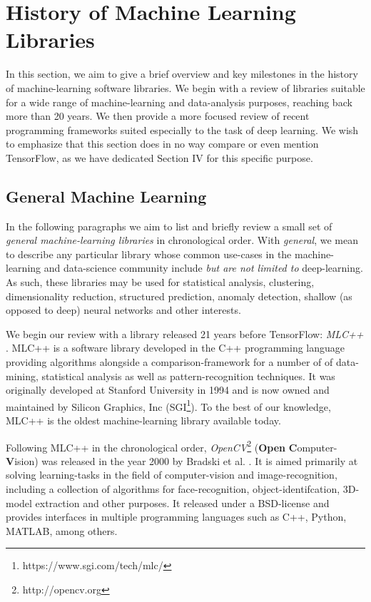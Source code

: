 \section{History of Machine Learning Libraries}

In this section, we aim to give a brief overview and key milestones in the
history of machine-learning software libraries. We begin with a review of
libraries suitable for a wide range of machine-learning and data-analysis
purposes, reaching back more than 20 years. We then provide a more focused
review of recent programming frameworks suited especially to the task of deep
learning. We wish to emphasize that this section does in no way compare or even
mention TensorFlow, as we have dedicated Section IV for this specific purpose.

\subsection{General Machine Learning}

In the following paragraphs we aim to list and briefly review a small set of
\emph{general machine-learning libraries} in chronological order. With
\emph{general}, we mean to describe any particular library whose common
use-cases in the machine-learning and data-science community include \emph{but
  are not limited to} deep-learning. As such, these libraries may be used for
statistical analysis, clustering, dimensionality reduction, structured
prediction, anomaly detection, shallow (as opposed to deep) neural networks and
other interests.

We begin our review with a library released 21 years before TensorFlow:
\emph{MLC++} \cite{mlcpp}. MLC++ is a software library developed in the C++
programming language providing algorithms alongside a comparison-framework for a
number of of data-mining, statistical analysis as well as pattern-recognition
techniques. It was originally developed at Stanford University in 1994 and is
now owned and maintained by Silicon Graphics, Inc
(SGI\footnote{https://www.sgi.com/tech/mlc/}). To the best of our knowledge,
MLC++ is the oldest machine-learning library available today.

Following MLC++ in the chronological order,
\emph{OpenCV}\footnote{http://opencv.org} (\textbf{Open}
\textbf{C}omputer-\textbf{V}ision) was released in the year 2000 by Bradski et
al. \cite{opencv}. It is aimed primarily at solving learning-tasks in the field
of computer-vision and image-recognition, including a collection of algorithms
for face-recognition, object-identifcation, 3D-model extraction and other
purposes. It released under a BSD-license and provides interfaces in multiple
programming languages such as C++, Python, MATLAB, among others.

